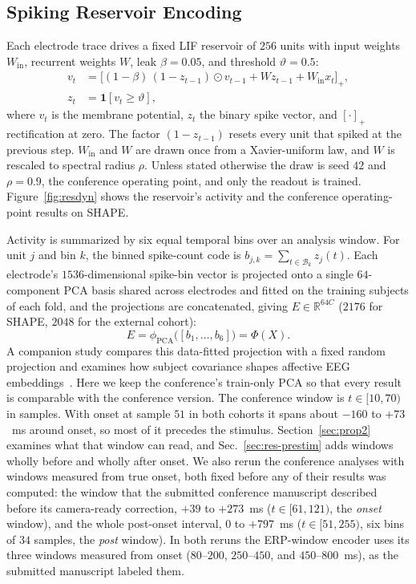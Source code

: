 \documentclass[journal]{IEEEtran}
\newcommand{\R}{\mathbb{R}}
\newcommand{\Ind}{\mathbf{1}}
\begin{document}
\subsection{Spiking Reservoir Encoding}
Each electrode trace drives a fixed LIF reservoir of $256$ units with input weights $W_{\mathrm{in}}$, recurrent weights $W$, leak $\beta=0.05$, and threshold $\vartheta=0.5$:
\begin{align}
    v_{t} &= \big[(1-\beta)\,(1-z_{t-1})\odot v_{t-1} + W z_{t-1} + W_{\mathrm{in}}x_t\big]_+, \\
    z_{t} &= \Ind[v_{t}\geq \vartheta],
\end{align}
where $v_t$ is the membrane potential, $z_t$ the binary spike vector, and $[\cdot]_+$ rectification at zero. The factor $(1-z_{t-1})$ resets every unit that spiked at the previous step. $W_{\mathrm{in}}$ and $W$ are drawn once from a Xavier-uniform law, and $W$ is rescaled to spectral radius $\rho$. Unless stated otherwise the draw is seed $42$ and $\rho=0.9$, the conference operating point, and only the readout is trained. Figure~\ref{fig:resdyn} shows the reservoir's activity and the conference operating-point results on SHAPE.

Activity is summarized by six equal temporal bins over an analysis window. For unit $j$ and bin $k$, the binned spike-count code is $b_{j,k}=\sum_{t\in\mathcal{B}_k} z_j(t)$. Each electrode's $1536$-dimensional spike-bin vector is projected onto a single $64$-component PCA basis shared across electrodes and fitted on the training subjects of each fold, and the projections are concatenated, giving $E\in\R^{64C}$ ($2176$ for SHAPE, $2048$ for the external cohort):
\begin{equation}\label{eq:operator}
E=\phi_{\mathrm{PCA}}\!\big([b_1,\dots,b_6]\big)=\Phi(X).
\end{equation}
A companion study compares this data-fitted projection with a fixed random projection and examines how subject covariance shapes affective EEG embeddings~\cite{lane2026entanglement}. Here we keep the conference's train-only PCA so that every result is comparable with the conference version.
The conference window is $t\in[10,70)$ in samples. With onset at sample $51$ in both cohorts it spans about $-160$ to $+73$~ms around onset, so most of it precedes the stimulus. Section~\ref{sec:prop2} examines what that window can read, and Sec.~\ref{sec:res-prestim} adds windows wholly before and wholly after onset. We also rerun the conference analyses with windows measured from true onset, both fixed before any of their results was computed: the window that the submitted conference manuscript described before its camera-ready correction, $+39$ to $+273$~ms ($t\in[61,121)$, the \emph{onset} window), and the whole post-onset interval, $0$ to $+797$~ms ($t\in[51,255)$, six bins of $34$ samples, the \emph{post} window). In both reruns the ERP-window encoder uses its three windows measured from onset ($80$--$200$, $250$--$450$, and $450$--$800$~ms), as the submitted manuscript labeled them.
\end{document}
